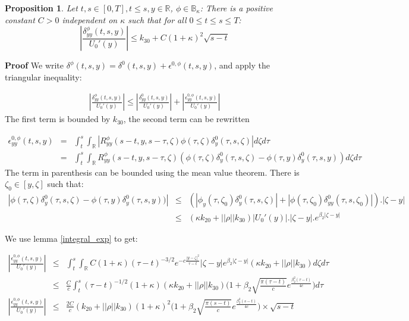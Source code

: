 \documentclass[11pt, psfig]{article}
\newtheorem{proposition}[theorem]{Proposition}
\theoremstyle{definition}
\theoremstyle{remark}
\numberwithin{equation}{section}
\def\sR{\mathbb{R}}
\def\sR{\mathbb{R}}
\newcommand{\be}{\begin{equation}}
\newcommand{\ee}{\end{equation}}
\def \proof{{\noindent \bf Proof}\quad}
\begin{document}
\begin{proposition}


Let $t, s \in [0,T], t\leq s, y\in \sR$,  $\phi \in \mathbb{B}_{\kappa}$:
There is a positive constant $C>0$ independent on $\kappa$ such that for all $0\leq t\leq s\leq T$:
\be
|\frac{ \delta_{yy}^{\phi}(t,s,y)}{U_0'(y)}|   \leq  k_{30}+C(1+\kappa)^2 \sqrt{s-t}
\ee
\end{proposition}
\proof
We write $\delta^{\phi}(t,s,y)=\delta^{0}(t,s,y)+\epsilon^{0,\phi}(t,s,y)$, and apply the triangular inequality:

\begin{eqnarray*}
|\frac{\delta_{yy}^{\phi}(t,s,y)}{U_0'(y)}|\leq |\frac{\delta_{yy}^{0}(t,s,y)}{U_0'(y)}|+|\frac{\epsilon_{yy}^{0,\phi}(t,s,y)}{U_0'(y)}|
\end{eqnarray*}
The first term is bounded by $k_{30}$, the second term can be rewritten

\begin{eqnarray*}
\epsilon_{yy}^{0,\phi}(t,s,y)&= &\int_t^s \int_{\sR} |R^{\phi}_{yy}(s-t,y,s-\tau,\zeta)
  \phi(\tau,\zeta) \delta^{0}_{y}(\tau,s,\zeta)| d\zeta d\tau \\
  &  = &\int_t^s \int_{\sR} R^{\phi}_{yy}(s-t,y,s-\tau,\zeta)(
   \phi(\tau,\zeta)\delta^{0}_{y}(\tau,s,\zeta) -   \phi(\tau,y) \delta^{0}_{y}(\tau,s,y)) d\zeta d\tau
\end{eqnarray*}
The term in parenthesis can be bounded using the mean value theorem. There is $\zeta_0\in [y,\zeta]$ such that:
 \begin{eqnarray*}
   |\phi(\tau,\zeta)\delta^{0}_{y}(\tau,s,\zeta) -   \phi(\tau,y) \delta^{0}_{y}(\tau,s,y))| & \leq & ( |\phi_y(\tau, \zeta_0)\delta^{0}_{y}(\tau,s,\zeta)| +|\phi(\tau,\zeta_0)\delta^{0}_{yy}(\tau,s,\zeta_0)|).|\zeta-y|\\
& \leq & (\kappa k_{20}  + ||\rho|| k_{30}) |U_0'(y)|. |\zeta-y| . e^{\beta_2 |\zeta-y|}
  \end{eqnarray*}

We use lemma \ref{integral_exp} to get:

\begin{eqnarray*}
|\frac{\epsilon_{yy}^{0,\phi}(t,s,y)}{U_0'(y)}|  &\leq & \int_t^s  \int_{\sR} C(1+\kappa)  (\tau-t)^{-3/2} e^{-{c} \frac{|y-\zeta|^2}{\tau-t}}  |\zeta-y| e^{\beta_2 |\zeta-y|}(\kappa k_{20} + ||\rho||  k_{30} )  d\zeta d\tau\\
& \leq & \frac{C}{c}\int_t^s  (\tau-t)^{-1/2} (1+\kappa) (\kappa k_{20} + ||\rho||  k_{30} ) \bigg(1+\beta_2 \sqrt{\frac{\pi (\tau-t)}{c}} e^{\frac{\beta_2^2(\tau-t)}{4 c}} \bigg) d\tau \\
|\frac{\epsilon_{yy}^{0,\phi}(t,s,y)}{U_0'(y)}|&\leq & \frac{2 C}{c}  ( k_{20} + ||\rho|| k_{30} )(1+\kappa)^2 \bigg(1+\beta_2 \sqrt{\frac{\pi (s-t)}{c}} e^{\frac{\beta_2^2(s-t)}{4 c}} \bigg) \times \sqrt{s-t}
\end{eqnarray*}
 
\end{document}
